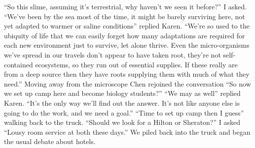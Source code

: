 \documentclass[a4paper]{article}
\begin{document}
“So this slime, assuming it’s terrestrial, why haven’t we seen it before?” I asked.
“We’ve been by the sea most of the time, it might be barely surviving here, not yet adapted to warmer or saline conditions” replied Karen. “We’re so used to the ubiquity of life that we can easily forget how many adaptations are required for each new environment just to survive, let alone thrive. Even the micro-organisms we’ve spread in our travels don’t appear to have taken root, they’re not self-contained ecosystems, so they run out of essential supplies. If these really are from a deep source then they have roots supplying them with much of what they need.”
Moving away from the microscope Chen rejoined the conversation “So now we set up camp here and become biology students?”
“We may as well” replied Karen. “It’s the only way we’ll find out the answer. It’s not like anyone else is going to do the work, and we need a goal.”
“Time to set up camp then I guess” walking back to the truck. “Should we look for a Hilton or Sheraton?” I asked “Lousy room service at both these days.” We piled back into the truck and began the usual debate about hotels.
\end{document}
